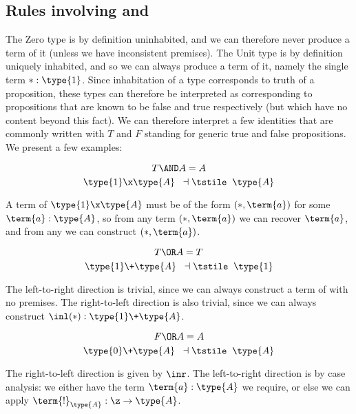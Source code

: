 \newpage

\subsection{Rules involving  and }

The Zero type is by definition uninhabited, and we can therefore never produce a term of it (unless we have inconsistent premises).  The Unit type is by definition uniquely inhabited, and so we can always produce a term of it, namely the single term $\ast:\type{1}$.  Since inhabitation of a type corresponds to truth of a proposition, these types can therefore be interpreted as corresponding to propositions that are known to be false and true respectively (but which have no content beyond this fact).  We can therefore interpret a few identities that are commonly written with $T$ and $F$ standing for generic true and false propositions.  We present a few examples:

\begin{Theorem}
\[
T \AND A = A
\]
\[
\type{1} \x \type{A} 
\;\;\dashv \tstile \;\;
\type{A}
\]
\end{Theorem}
\begin{Proof}
A term of $\type{1} \x \type{A}$ must be of the form $(\ast,\term{a})$ for some $\term{a}:\type{A}$, so from any term $(\ast,\term{a})$ we can recover $\term{a}$, and from any  we can construct $(\ast,\term{a})$.
\end{Proof}

\begin{Theorem}
\[
T \OR A = T
\]
\[
\type{1} \+ \type{A} 
\;\;\dashv \tstile \;\;
\type{1}
\]
\end{Theorem}
\begin{Proof}
The left-to-right direction is trivial, since we can always construct a term of  with no premises.  The right-to-left direction is also trivial, since we can always construct $\inl(\ast):\type{1} \+ \type{A}$.
\end{Proof}

\begin{Theorem}
\[
F \OR A = A
\]
\[
\type{0} \+ \type{A} 
\;\;\dashv \tstile \;\;
\type{A}
\]
\end{Theorem}
\begin{Proof}
The right-to-left direction is given by $\inr$.  The left-to-right direction is by case analysis: we either have the term $\term{a}:\type{A}$ we require, or else we can apply $\term{!}_{\type{A}}:\z \to \type{A}$.
\end{Proof}



